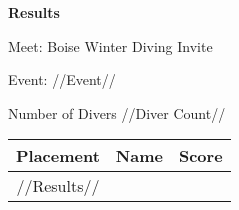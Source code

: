 \documentclass[12pt, letterpaper, landscape]{article}
\begin{document}
	\begin{center}
		\textbf{Results}
	\end{center}
	
    Meet: Boise Winter Diving Invite
    
    Event: //Event//

	Number of Divers //Diver Count//
	
	\begin{table}[h]
		\centering
			\begin{tabularx}{\textwidth}{|c X X|}
			Placement&Name&Score\\\midrule
            //Results//
		\end{tabularx}
	\end{table}
\end{document}
